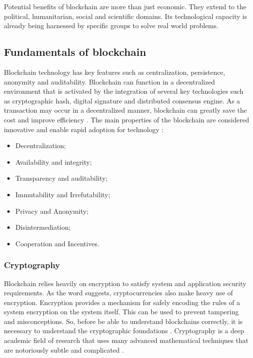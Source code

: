 Potential benefits of blockchain are more than just economic. They extend to the political, humanitarian, social and scientific domains. Its technological capacity is already being harnessed by specific groups to solve real world problems.

\subsection{Fundamentals of blockchain}\label{sec:fundamentals}
Blockchain technology has key features such as centralization, persistence, anonymity and auditability. Blockchain can function in a decentralized environment that is activated by the integration of several key technologies such as cryptographic hash, digital signature and distributed consensus engine. As a transaction may occur in a decentralized manner, blockchain can greatly save the cost and improve efficiency \cite{zheng2016blockchain}. The main properties of the blockchain are considered innovative and enable rapid adoption for technology \cite{greve2018blockchain}:

\begin{itemize}
\item Decentralization;
\item Availability and integrity;
\item Transparency and auditability;
\item Immutability and Irrefutability;
\item Privacy and Anonymity;
\item Disintermediation;
\item Cooperation and Incentives.
\end{itemize}


\subsubsection{Cryptography}\label{sec:criptografia}
Blockchain relies heavily on encryption to satisfy system and application security requirements. As the word suggests, cryptocurrencies also make heavy use of encryption. Encryption provides a mechanism for safely encoding the rules of a system encryption on the system itself. This can be used to prevent tampering and misconceptions. So, before be able to understand blockchains correctly, it is necessary to understand the cryptographic foundations \cite{narayanan2016bitcoin}. Cryptography is a deep academic field of research that uses many advanced mathematical techniques that are notoriously subtle and complicated \cite{narayanan2016bitcoin}.

